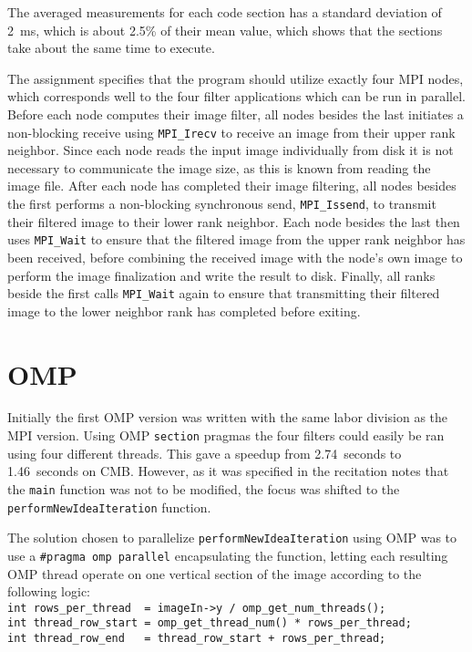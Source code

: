 The averaged measurements for each code section has a standard deviation of 2~ms, which is about 2.5\% of their mean value, which shows that the sections take about the same time to execute.

The assignment specifies that the program should utilize exactly four \ac{MPI} nodes, which corresponds well to the four filter applications which can be run in parallel. Before each node computes their image filter, all nodes besides the last initiates a non-blocking receive using \texttt{MPI\_Irecv} to receive an image from their upper rank neighbor. Since each node reads the input image individually from disk it is not necessary to communicate the image size, as this is known from reading the image file. After each node has completed their image filtering, all nodes besides the first performs a non-blocking synchronous send, \texttt{MPI\_Issend}, to transmit their filtered image to their lower rank neighbor. Each node besides the last then uses \texttt{MPI\_Wait} to ensure that the filtered image from the upper rank neighbor has been received, before combining the received image with the node's own image to perform the image finalization and write the result to disk. Finally, all ranks beside the first calls \texttt{MPI\_Wait} again to ensure that transmitting their filtered image to the lower neighbor rank has completed before exiting.

\section*{\ac{OMP}}

Initially the first \ac{OMP} version was written with the same labor division as the \ac{MPI} version. Using \ac{OMP} \texttt{section} pragmas the four filters could easily be ran using four different threads. This gave a speedup from 2.74~seconds to 1.46~seconds on \ac{CMB}. However, as it was specified in the recitation notes that the \texttt{main} function was not to be modified, the focus was shifted to the \texttt{performNewIdeaIteration} function.

The solution chosen to parallelize \texttt{performNewIdeaIteration} using \ac{OMP} was to use a \texttt{\#pragma omp parallel} encapsulating the function, letting each resulting \ac{OMP} thread operate on one vertical section of the image according to the following logic:\\

\texttt{int rows\_per\_thread~~= imageIn->y / omp\_get\_num\_threads();\\
int thread\_row\_start~= omp\_get\_thread\_num() * rows\_per\_thread;\\
int thread\_row\_end~~~= thread\_row\_start + rows\_per\_thread;
}\\

